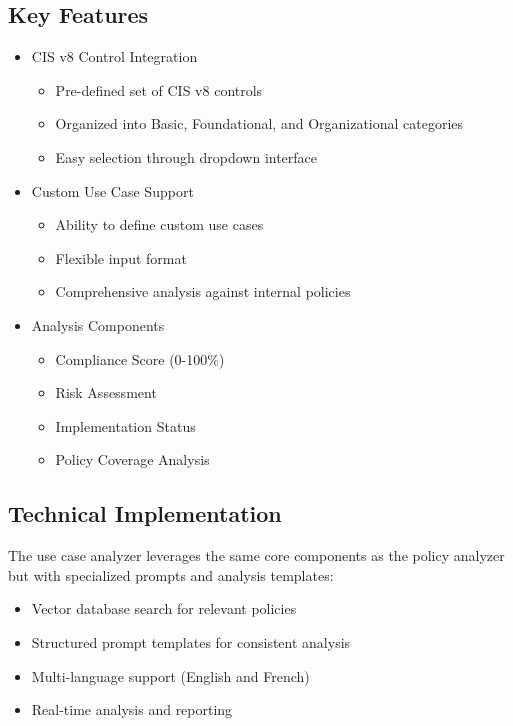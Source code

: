\documentclass[11pt,a4paper]{article}
\begin{document}
\subsection{Key Features}
\begin{itemize}
    \item CIS v8 Control Integration
    \begin{itemize}
        \item Pre-defined set of CIS v8 controls
        \item Organized into Basic, Foundational, and Organizational categories
        \item Easy selection through dropdown interface
    \end{itemize}
    \item Custom Use Case Support
    \begin{itemize}
        \item Ability to define custom use cases
        \item Flexible input format
        \item Comprehensive analysis against internal policies
    \end{itemize}
    \item Analysis Components
    \begin{itemize}
        \item Compliance Score (0-100\%)
        \item Risk Assessment
        \item Implementation Status
        \item Policy Coverage Analysis
    \end{itemize}
\end{itemize}

\subsection{Technical Implementation}
The use case analyzer leverages the same core components as the policy analyzer but with specialized prompts and analysis templates:
\begin{itemize}
    \item Vector database search for relevant policies
    \item Structured prompt templates for consistent analysis
    \item Multi-language support (English and French)
    \item Real-time analysis and reporting
\end{itemize}
\end{document}
